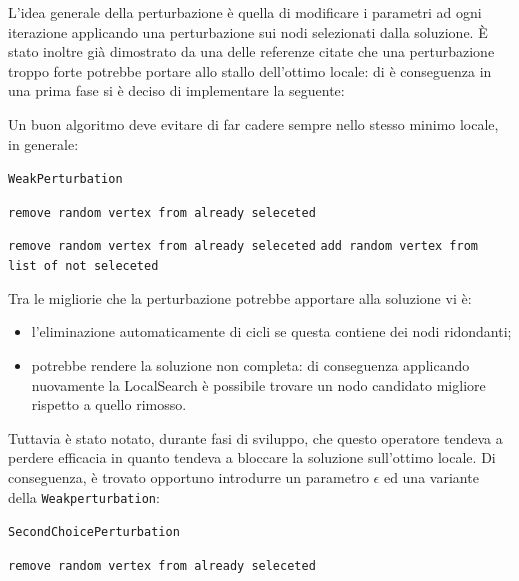 \documentclass[11pt]{article}
\begin{document}
L'idea generale della perturbazione è quella di modificare i parametri ad ogni iterazione applicando una perturbazione sui nodi selezionati dalla soluzione.
È stato inoltre già dimostrato da una delle referenze citate che una perturbazione troppo forte potrebbe portare allo stallo dell'ottimo locale: di è conseguenza in una
prima fase si è deciso di implementare la seguente:

Un buon algoritmo deve evitare di far cadere sempre nello stesso minimo locale, in generale:

\begin{algorithm}
\caption{\texttt{WeakPerturbation}}
\begin{algorithmic}

\State\texttt{remove random vertex from already seleceted}

\Else{}
\State\texttt{remove random vertex from already seleceted}
\State\texttt{add random vertex from list of not seleceted}

\EndIf{}

\end{algorithmic}
\end{algorithm}

Tra le migliorie che la perturbazione potrebbe apportare alla soluzione vi è:
\begin{itemize}
\item{l'eliminazione automaticamente di cicli se questa contiene dei nodi ridondanti;}
\item{potrebbe rendere la soluzione non completa: di conseguenza applicando nuovamente la LocalSearch è possibile trovare un nodo candidato migliore rispetto a quello rimosso.}
\end{itemize}

Tuttavia è stato notato, durante fasi di sviluppo, che questo operatore tendeva a perdere efficacia in quanto tendeva a bloccare la soluzione sull'ottimo locale.
Di conseguenza, è trovato opportuno introdurre un parametro $\epsilon$ ed una variante della \texttt{Weakperturbation}:

\begin{algorithm}
    \caption{\texttt{SecondChoicePerturbation}}
    \begin{algorithmic}
    \State\texttt{remove random vertex from already seleceted}    
\end{algorithmic}
\end{algorithm}
\end{document}
